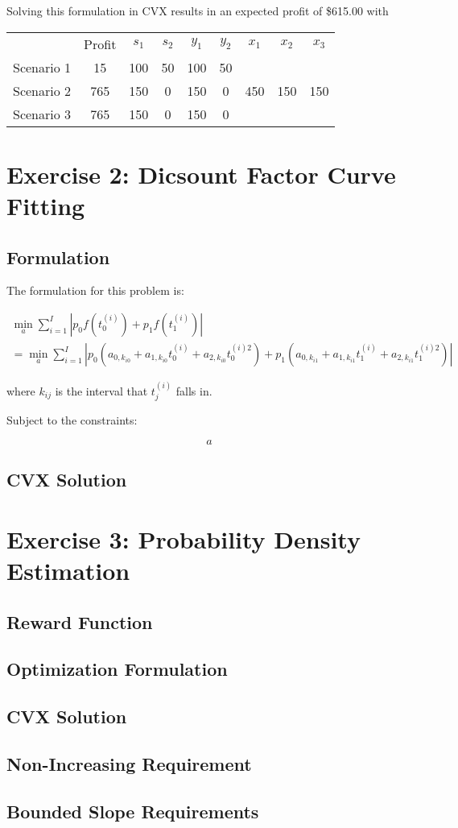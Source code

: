 \documentclass[a4paper]{article}
\begin{document}
Solving this formulation in CVX results in an expected profit of \$615.00 with

\begin{tabular}{c  c  c c  c c c c c}
           & Profit & $s_1$ & $s_2$ & $y_1$ & $y_2$ & $x_1$ & $x_2$ & $x_3$ \\
Scenario 1 &   15   & 100   & 50    & 100   & 50    &       &       &       \\
Scenario 2 &  765   & 150   & 0     & 150   & 0     & 450   & 150   & 150   \\
Scenario 3 &  765   & 150   & 0     & 150   & 0     &       &       &       \\
\end{tabular}

\section{Exercise 2: Dicsount Factor Curve Fitting }
\subsection{Formulation}
The formulation for this problem is:

\begin{equation}
  \begin{split}
\min_a \sum_{i=1}^I | p_0 f(t_0^{(i)}) +  p_1 f(t_1^{(i)}) |
\\ = \min_a \sum_{i=1}^I | p_0 (a_{0,k_{i0}} + a_{1,k_{i0}} t_0^{(i)} + a_{2,k_{i0}} t_0^{(i) 2} ) 
+  p_1 (a_{0,k_{i1}} + a_{1,k_{i1}} t_1^{(i)} + a_{2,k_{i1}} t_1^{(i) 2} ) |
  \end{split}
\end{equation}

where $k_{ij}$ is the interval that $t_j^{(i)}$ falls in.

Subject to the constraints:

\begin{equation}
a
\end{equation}

\subsection{CVX Solution}

\section{Exercise 3: Probability Density Estimation}
\subsection{Reward Function}

\subsection{Optimization Formulation}

\subsection{CVX Solution}

\subsection{Non-Increasing Requirement}

\subsection{Bounded Slope Requirements}
\end{document}
